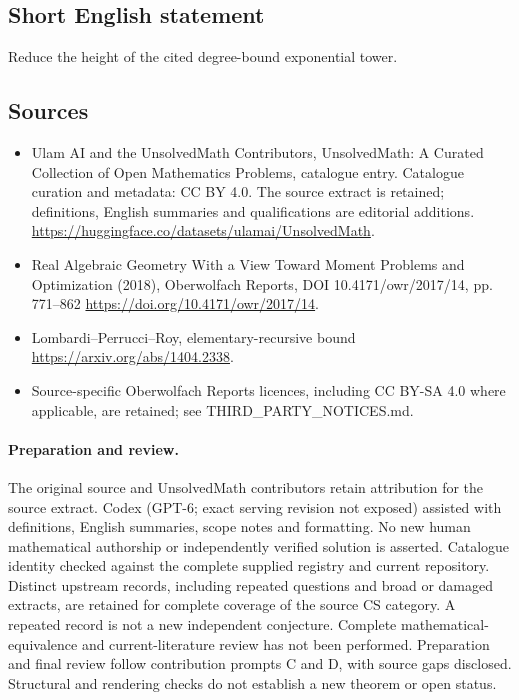 \documentclass[11pt]{article}
\begin{document}
\subsection{Short English statement}
Reduce the height of the cited degree-bound exponential tower.
\subsection{Sources}
\begin{itemize}
\item[\hypertarget{source:statement:1}{S1}] Ulam AI and the UnsolvedMath Contributors, UnsolvedMath: A Curated Collection of Open Mathematics Problems, catalogue entry. Catalogue curation and metadata: CC BY 4.0. The source extract is retained; definitions, English summaries and qualifications are editorial additions.
\url{https://huggingface.co/datasets/ulamai/UnsolvedMath}.
\item[\hypertarget{source:statement:2}{S2}] Real Algebraic Geometry With a View Toward Moment Problems and Optimization (2018), Oberwolfach Reports, DOI 10.4171/owr/2017/14, pp. 771--862
\url{https://doi.org/10.4171/owr/2017/14}.
\item[\hypertarget{source:statement:3}{S3}] Lombardi--Perrucci--Roy, elementary-recursive bound
\url{https://arxiv.org/abs/1404.2338}.
\item Source-specific Oberwolfach Reports licences, including CC BY-SA 4.0 where applicable, are retained; see THIRD\_PARTY\_NOTICES.md.
\end{itemize}
\paragraph{Preparation and review.}
The original source and UnsolvedMath contributors retain attribution for the source extract. Codex (GPT-6; exact serving revision not exposed) assisted with definitions, English summaries, scope notes and formatting. No new human mathematical authorship or independently verified solution is asserted. Catalogue identity checked against the complete supplied registry and current repository. Distinct upstream records, including repeated questions and broad or damaged extracts, are retained for complete coverage of the source CS category. A repeated record is not a new independent conjecture. Complete mathematical-equivalence and current-literature review has not been performed. Preparation and final review follow contribution prompts C and D, with source gaps disclosed. Structural and rendering checks do not establish a new theorem or open status.
\label{end:statement}
\end{document}

